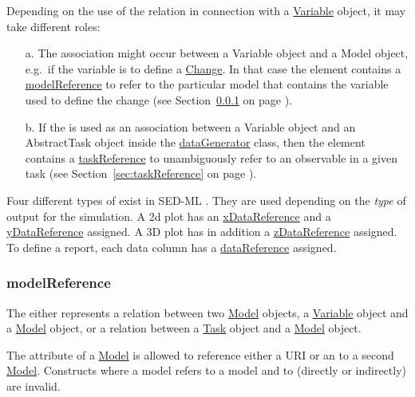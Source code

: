 Depending on the use of the  relation in connection with a \hyperref[class:variable]{Variable} object, it may take different roles: 

\begin{enumerate}
\item[a.]{The  association might occur between a Variable object and a Model object, e.g.\ if the variable is to define a \hyperref[class:change]{Change}. 
In that case the  element contains a \hyperref[sec:modelReference]{modelReference} to refer to the particular model that contains the variable used to define the change (see Section~\ref{sec:modelReference} on page \pageref{sec:modelReference}). }
\item[b.]{If the  is used as an association between a Variable object and an AbstractTask object inside the \hyperref[class:dataGenerator]{dataGenerator} class, then the  element contains a \hyperref[sec:taskReference]{taskReference} to unambiguously refer to an observable in a given task (see Section~\ref{sec:taskReference} on page \pageref{sec:taskReference}).}
\end{enumerate}

Four different types of  exist in SED-ML \currentLV. They are used depending on the \emph{type} of output for the simulation. A 2d plot has an \hyperref[sec:xDataReference]{xDataReference} and a \hyperref[sec:yDataReference]{yDataReference} assigned. A 3D plot has in addition a \hyperref[sec:zDataReference]{zDataReference} assigned. To define a report, each data column has a \hyperref[sec:dataReference1]{dataReference} assigned.


\subsubsection{modelReference}
\label{sec:modelReference}
%
The  either represents a relation between two \hyperref[class:model]{Model} objects, a \hyperref[class:variable]{Variable} object and a \hyperref[class:model]{Model} object, or  a relation between a \hyperref[class:task]{Task} object and a \hyperref[class:model]{Model} object.

The  attribute of a \hyperref[class:model]{Model} is allowed to reference either a URI or an  to a second
\hyperref[class:model]{Model}. Constructs where a model  refers to a model  and  to  (directly or indirectly) are invalid.

